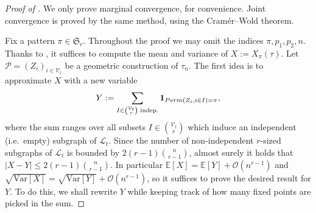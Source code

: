 \documentclass{article}
\theoremstyle{remark}
\def\O{\mathcal{O}}
\newcommand{\card}[1]{\left|#1\right|}
\newcommand{\mean}[1]{\mathbb{E}\left[#1\right]}
\newcommand{\var}[1]{\mathrm{Var}\left[#1\right]}
\newcommand{\One}[1]{\mathbf{1}_{#1}}
\def\S{\mathfrak{S}}
\def\pts{\mathcal{P}}
\newcommand{\perm}[1]{{\rm Perm}\left(#1\right)}
\def\L{\mathcal{L}}
\def\Vert{\mathcal{V}}
\begin{document}
\begin{proof}[Proof of ]
    We only prove marginal convergence, for convenience.
    Joint convergence is proved by the same method, using the Cram\'er--Wold theorem.

    Fix a pattern $\pi\in\S_r$.
    Throughout the proof we may omit the indices $\pi,p_1,p_2,n$.
    Thanks to , it suffices to compute the mean and variance of $X:=X_\pi(\tau)$.
    Let $\pts=(Z_i)_{i\in\Vert_t}$ be a geometric construction of $\tau_n$.
    The first idea is to approximate $X$ with a new variable
    \begin{equation*}
        Y := \sum_{I\in\binom{\Vert_t}{r}\text{ indep.}}\One{\perm{Z_i,i\in I}=\pi} ,
    \end{equation*}
    where the sum ranges over all subsets $I\in\binom{\Vert_t}{r}$ which induce an independent (i.e.~empty) subgraph of $\L_t$.
    Since the number of non-independent $r$-sized subgraphs of $\L_t$ is bounded by $2(r-1)\binom{n}{r-1}$, almost surely it holds that $\card{X - Y} \le 2(r-1)\binom{n}{r-1}$.
    In particular $\mean{X} = \mean{Y} + \O\left(n^{r-1}\right)$ and $\sqrt{\var{X}} = \sqrt{\var{Y}} + \O\left(n^{r-1}\right)$, so it suffices to prove the desired result for $Y$.
    To do this, we shall rewrite $Y$ while keeping track of how many fixed points are picked in the sum.


\end{proof}
\end{document}
